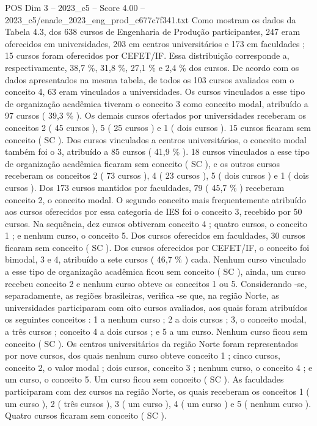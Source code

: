 \begin{textsample}{POS Dim 3 – 2023\_c5 – Score 4.00 – 2023\_c5/enade\_2023\_eng\_prod\_c677c7f341.txt}
Como mostram os dados da Tabela 4.3, dos 638 cursos de Engenharia de Produção participantes, 247 eram oferecidos em universidades, 203 em centros universitários e 173 em faculdades ; 15 cursos foram oferecidos por CEFET/IF.
Essa distribuição corresponde a, respectivamente, 38,7 \%, 31,8 \%, 27,1 \% e 2,4 \% dos cursos.
De acordo com os dados apresentados na mesma tabela, de todos os 103 cursos avaliados com o conceito 4, 63 eram vinculados a universidades.
Os cursos vinculados a esse tipo de organização acadêmica tiveram o conceito 3 como conceito modal, atribuído a 97 cursos ( 39,3 \% ).
Os demais cursos ofertados por universidades receberam os conceitos 2 ( 45 cursos ), 5 ( 25 cursos ) e 1 ( dois cursos ). 15 cursos ficaram sem conceito ( SC ).
Dos cursos vinculados a centros universitários, o conceito modal também foi o 3, atribuído a 85 cursos ( 41,9 \% ). 18 cursos vinculados a esse tipo de organização acadêmica ficaram sem conceito ( SC ), e os outros cursos receberam os conceitos 2 ( 73 cursos ), 4 ( 23 cursos ), 5 ( dois cursos ) e 1 ( dois cursos ).
Dos 173 cursos mantidos por faculdades, 79 ( 45,7 \% ) receberam conceito 2, o conceito modal.
O segundo conceito mais frequentemente atribuído aos cursos oferecidos por essa categoria de IES foi o conceito 3, recebido por 50 cursos.
Na sequência, dez cursos obtiveram conceito 4 ; quatro cursos, o conceito 1 ; e nenhum curso, o conceito 5.
Dos cursos oferecidos em faculdades, 30 cursos ficaram sem conceito ( SC ).
Dos cursos oferecidos por CEFET/IF, o conceito foi bimodal, 3 e 4, atribuído a sete cursos ( 46,7 \% ) cada.
Nenhum curso vinculado a esse tipo de organização acadêmica ficou sem conceito ( SC ), ainda, um curso recebeu conceito 2 e nenhum curso obteve os conceitos 1 ou 5.
Considerando -se, separadamente, as regiões brasileiras, verifica -se que, na região Norte, as universidades participaram com oito cursos avaliados, aos quais foram atribuídos os seguintes conceitos : 1 a nenhum curso ; 2 a dois cursos ; 3, o conceito modal, a três cursos ; conceito 4 a dois cursos ; e 5 a um curso.
Nenhum curso ficou sem conceito ( SC ).
Os centros universitários da região Norte foram representados por nove cursos, dos quais nenhum curso obteve conceito 1 ; cinco cursos, conceito 2, o valor modal ; dois cursos, conceito 3 ; nenhum curso, o conceito 4 ; e um curso, o conceito 5.
Um curso ficou sem conceito ( SC ).
As faculdades participaram com dez cursos na região Norte, os quais receberam os conceitos 1 ( um curso ), 2 ( três cursos ), 3 ( um curso ), 4 ( um curso ) e 5 ( nenhum curso ).
Quatro cursos ficaram sem conceito ( SC ).

\end{textsample}
